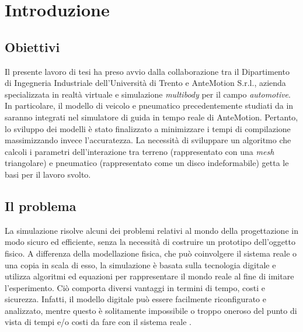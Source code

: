 \chapter{Introduzione}
\label{Introduzione}
%
\section{Obiettivi}
Il presente lavoro di tesi ha preso avvio dalla collaborazione tra il Dipartimento di Ingegneria Industriale dell'Università di Trento e AnteMotion S.r.l., azienda specializzata in realtà virtuale e simulazione \textit{multibody} per il campo \textit{automotive}. In particolare, il modello di veicolo e pneumatico precedentemente studiati da \citeauthor{Larcher} in \cite{Larcher} saranno integrati nel simulatore di guida in tempo reale di AnteMotion. Pertanto, lo sviluppo dei modelli è stato finalizzato a minimizzare i tempi di compilazione massimizzando invece l'accuratezza. La necessità di sviluppare un algoritmo che calcoli i parametri dell'interazione tra terreno (rappresentato con una \textit{mesh} triangolare) e pneumatico (rappresentato come un disco indeformabile) getta le basi per il lavoro svolto.
%
\section{Il problema}
La simulazione risolve alcuni dei problemi relativi al mondo della progettazione in modo sicuro ed efficiente, senza la necessità di costruire un prototipo dell'oggetto fisico. A differenza della modellazione fisica, che può coinvolgere il sistema reale o una copia in scala di esso, la simulazione è basata sulla tecnologia digitale e utilizza algoritmi ed equazioni per rappresentare il mondo reale al fine di imitare l'esperimento. Ciò comporta diversi vantaggi in termini di tempo, costi e sicurezza. Infatti, il modello digitale può essere facilmente riconfigurato e analizzato, mentre questo è solitamente impossibile o troppo oneroso del punto di vista di tempi e/o costi da fare con il sistema reale \cite{Anu}.

